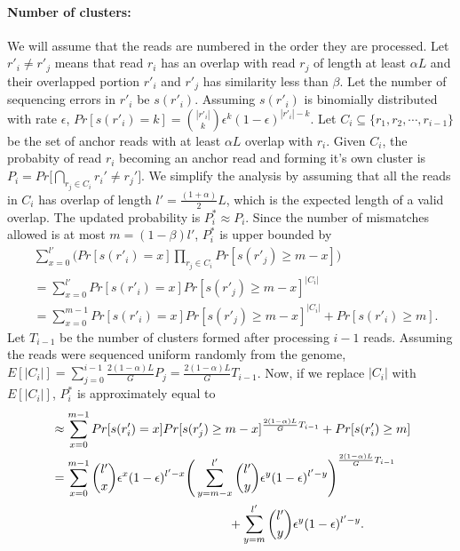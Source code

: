 \documentclass[a4paper]{article}
\begin{document}
\paragraph{Number of clusters:}
We will assume that the reads are numbered in the order they are processed.
Let $r'_i \ne r'_j$ means that read $r_i$ has an overlap with read $r_j$ of 
length at least $\alpha L$ and their overlapped portion $r'_i$ and $r'_j$ 
has similarity less than $\beta$. 
Let the number of sequencing errors in $r'_i$ be $s(r'_i)$. Assuming
$s(r'_i)$ is binomially distributed with rate $\epsilon$, 
$Pr[ s(r'_i) = k ] = {|r'_i| \choose k} \epsilon^k (1-\epsilon)^{|r'_i|-k}$.
Let $C_i \subseteq \{r_1, r_2, \cdots , r_{i-1}\}$ be the set of 
anchor reads with at least $\alpha L$ overlap with $r_i$. 
Given $C_i$, the probabity of read $r_i$ becoming an anchor read and 
forming it's own cluster is 
$P_i = Pr\big[ \bigcap\limits_{r_j \in C_i} r_i' \ne r_j' \big]$.
We simplify the analysis by assuming that all the reads in 
$C_i$ has overlap of length $l'=\frac{(1+\alpha)}{2} L$, which is the 
expected length of a valid overlap. The updated probability is 
$P_i^* \approx P_i$.
Since the number of mismatches allowed is at most  
$ m =  (1-\beta)l'$, $P_i^*$ is upper bounded by
\begin{align*}
& \sum\limits_{x=0}^{l'} \bigg( Pr[s(r'_i)=x] \prod_{r_j \in C_i} Pr[s(r'_j) \ge m - x] \bigg) \\
&= \sum\limits_{x=0}^{l'} Pr[s(r'_i)=x] Pr[s(r'_j) \ge m - x]^{|C_i|} \\
&= \sum\limits_{x=0}^{m - 1} Pr[s(r'_i)=x] Pr[s(r'_j) \ge m - x]^{|C_i|} + Pr[s(r'_i) \ge m] .
\end{align*}
Let $T_{i-1}$ be the number of clusters formed after processing $i-1$ reads.
Assuming the reads were sequenced uniform randomly from the genome,
$E[|C_i|] = \sum\limits_{j=0}^{i-1} \frac{2(1-\alpha)L}{G} P_{j} = \frac{2(1-\alpha)L}{G} T_{i-1}$.
Now, if we replace $|C_i|$ with $E[|C_i|]$, $P_i^*$ is approximately equal to
\begin{align*}
& \approx \sum\limits_{x=0}^{m - 1} Pr[s(r'_i)=x] 
Pr[s(r'_j) \ge m - x]^{\frac{2(1-\alpha)L}{G} T_{i-1}} + Pr[s(r'_i) \ge m] \\
& = \sum\limits_{x=0}^{m - 1} 
{ l' \choose x} \epsilon^x (1-\epsilon)^{l'-x} 
\Bigg( \sum\limits_{y = m-x}^{l'} { l' \choose y} \epsilon^{y} (1-\epsilon)^{l'-y}\Bigg)^{\frac{2(1-\alpha)L}{G} T_{i-1}} \\
& \hspace{50mm} + \sum\limits_{y = m}^{l'} { l' \choose y} \epsilon^{y} (1-\epsilon)^{l'-y}.
\end{align*}
\end{document}
